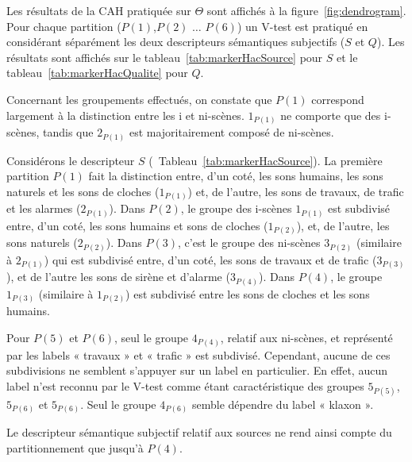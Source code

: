 Les résultats de la CAH pratiquée sur $\Theta$ sont affichés à la figure~\ref{fig:dendrogram}. Pour chaque partition ($P(1)$,$P(2)$ $\ldots$ $P(6)$) un V-test est pratiqué en considérant séparément les deux descripteurs sémantiques subjectifs ($S$ et $Q$). Les résultats sont affichés sur le tableau~\ref{tab:markerHacSource} pour $S$ et le tableau~\ref{tab:markerHacQualite} pour $Q$.

Concernant les groupements effectués, on constate que $P(1)$ correspond largement à la distinction entre les i et ni-scènes. $1_{P(1)}$ ne comporte que des i-scènes, tandis que $2_{P(1)}$ est majoritairement composé de ni-scènes.

Considérons le descripteur $S$ (\cf~Tableau~\ref{tab:markerHacSource}). La première partition $P(1)$ fait la distinction entre, d'un coté, les sons humains, les sons naturels et les sons de cloches ($1_{P(1)}$) et, de l'autre, les sons de travaux, de trafic et les alarmes ($2_{P(1)}$). Dans $P(2)$, le groupe des i-scènes $1_{P(1)}$ est subdivisé entre, d'un coté, les sons humains et sons de cloches ($1_{P(2)}$), et, de l'autre, les sons naturels ($2_{P(2)}$). Dans $P(3)$, c'est le groupe des ni-scènes $3_{P(2)}$ (similaire à $2_{P(1)}$) qui est subdivisé entre, d'un coté, les sons de travaux et de trafic ($3_{P(3)}$), et de l'autre les sons de sirène et d'alarme ($3_{P(4)}$). Dans $P(4)$, le groupe $1_{P(3)}$ (similaire à $1_{P(2)}$) est subdivisé entre les sons de cloches et les sons humains.

Pour $P(5)$ et $P(6)$, seul le groupe $4_{P(4)}$, relatif aux ni-scènes, et représenté par les labels « travaux » et « trafic » est subdivisé. Cependant, aucune de ces subdivisions ne semblent s'appuyer sur un label en particulier. En effet, aucun label n'est reconnu par le V-test comme étant caractéristique des groupes $5_{P(5)}$, $5_{P(6)}$ et $5_{P(6)}$. Seul le groupe $4_{P(6)}$ semble dépendre du label « klaxon ». 

Le descripteur sémantique subjectif relatif aux sources ne rend ainsi compte du partitionnement que jusqu'à $P(4)$.

